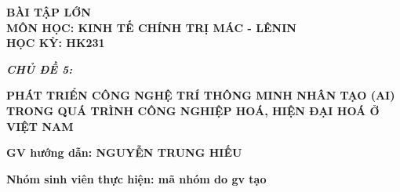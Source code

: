 \documentclass[a4paper]{article}
\begin{document}
\begin{titlepage}
\begin{center}
    \vspace{10pt}
    \fontsize{16pt}{15pt}\selectfont 
    \textbf{BÀI TẬP LỚN}\\
    \vspace{7pt}
    \textbf{MÔN HỌC: KINH TẾ CHÍNH TRỊ MÁC - LÊNIN}\\
    \vspace{7pt}
    \textbf{HỌC KỲ: HK231}\\[1.5cm]
\end{center}
\begin{flushleft}
    \fontsize{14pt}{17pt}\selectfont  
    \textbf{\textsl{CHỦ ĐỀ 5:}}
\end{flushleft}
\begin{center}
    \fontsize{18pt}{17pt}\selectfont 
    \textbf{\textrm{PHÁT TRIỂN CÔNG NGHỆ TRÍ THÔNG MINH NHÂN TẠO (AI) TRONG QUÁ TRÌNH CÔNG NGHIỆP HOÁ, HIỆN ĐẠI HOÁ Ở VIỆT NAM}}
\end{center}

\vspace{15pt}
\textbf{GV hướng dẫn: NGUYỄN TRUNG HIẾU}

\vspace{10pt}
\textbf{Nhóm sinh viên thực hiện: mã nhóm do gv tạo}


\end{titlepage}
\end{document}
